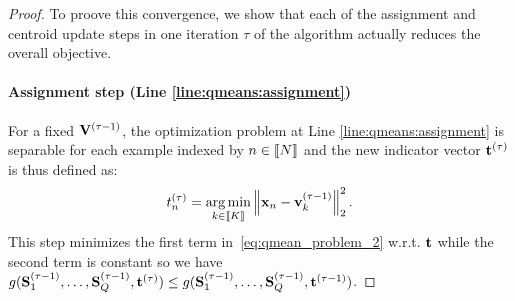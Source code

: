 
\begin{proof}
To proove this convergence, we show that each of the assignment and centroid update steps in one iteration $\tau$ of the algorithm actually reduces the overall objective. 





\paragraph{Assignment step (Line \ref{line:qmeans:assignment})} For a fixed ${\mathbf{V}}^{(\tau-1)}$, the optimization problem at Line \ref{line:qmeans:assignment} is separable for each example indexed by $n \in \left \llbracket N\right \rrbracket$ and the new indicator vector ${\mathbf{t}}^{(\tau)}$ is thus defined as:
%
\begin{align}
\label{eq:qmean_problem_U_fixed}
 t^{(\tau)}_n = \operatorname*{arg\,min}_{k \in \left \llbracket K\right \rrbracket} \left \| {\mathbf{x}}_n - {\mathbf{v}}_k^{(\tau-1)}\right \|_2^2.
\end{align}
%
This step minimizes the first term in~\eqref{eq:qmean_problem_2} w.r.t. ${\mathbf{t}}$ while the second term is constant so we have $g({\mathbf{S}}_1^{(\tau-1)}, \ldots,{\mathbf{S}}_Q^{(\tau-1)}, {\mathbf{t}}^{(\tau)}) \leq g({\mathbf{S}}_1^{(\tau-1)}, \ldots,{\mathbf{S}}_Q^{(\tau-1)}, {\mathbf{t}}^{(\tau-1)})$.


\end{proof}
